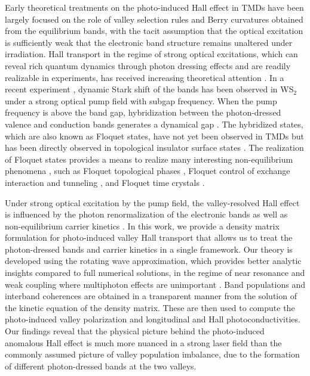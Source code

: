 \documentclass[reprint,amsmath,amssymb,aps,prb]{revtex4-1}
\begin{document}
Early theoretical treatments on the photo-induced Hall effect in TMDs have %
been largely focused on the role of valley selection rules and Berry curvatures obtained from the equilibrium bands, with  the tacit assumption that the optical excitation is sufficiently weak that the electronic band structure remains unaltered under irradiation. Hall transport in the regime of strong optical excitations, which can reveal rich quantum dynamics through photon dressing effects and are readily realizable in experiments, has received increasing theoretical attention \cite{Oka1,Torres,AHE_Mitra,AHE_Ran,AHE_Law,WRL1}.
In a recent experiment \cite{sie2015valley}, dynamic Stark shift of the bands has been observed in WS$_2$ under a strong optical pump field with subgap frequency. When the pump frequency is above the band gap, hybridization between the photon-dressed valence and conduction 
bands generates a dynamical gap \cite{Galitskii_EM,OptStark1}. The hybridized states, which are also known as Floquet states, have not yet been observed in TMDs but has been directly observed in topological insulator surface states \cite{GedikFloquet1, GedikFloquet2}. The realization of Floquet states provides a means to realize many interesting non-equilibrium phenomena \cite{Oka_Review}, such as  Floquet topological phases \cite{lindner2011floquet, Floq_Phase1}, Floquet control of exchange interaction \cite{Floq_RKKY1,Floq_RKKY2} and tunneling \cite{Floq_Tunnel}, and Floquet time crystals \cite{Floq_TC1}. 

Under strong optical excitation by the pump field, the valley-resolved Hall effect is influenced by the  photon renormalization of the electronic bands as well as non-equilibrium carrier kinetics \cite{kovalev2018valley}. In this work, we provide a density matrix formulation for photo-induced valley Hall transport that allows us to treat the photon-dressed bands and carrier kinetics in a single framework. Our theory is developed using the rotating wave approximation, which provides better analytic insights compared to full numerical solutions, in the regime of near resonance and weak coupling where multiphoton effects are unimportant \cite{WRL1}. Band populations and interband coherences are obtained in a transparent manner from the solution of the kinetic equation of the density matrix. These are then used to compute the photo-induced valley polarization and longitudinal and Hall photoconductivities. Our findings reveal that the physical picture behind the photo-induced anomalous Hall effect is much more nuanced in a strong laser field than the commonly assumed picture of valley population imbalance, due to the formation of different photon-dressed bands at the two valleys. 
\end{document}
